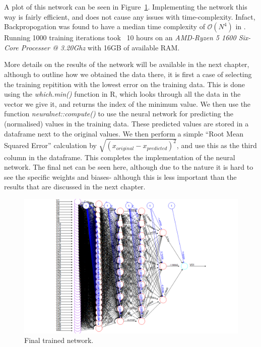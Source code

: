 A plot of this network can be seen in Figure~\ref{bestnet}. Implementing the network this way is fairly efficient, and does not cause any issues with time-complexity. Infact, Backpropogation 
was found to have a median time complexity of $\mathcal{O}(N^4)$ in \cite{lister}. Running 1000 training iterations took ~10 hours on an \textit{AMD-Ryzen 5 1600 Six-Core Processer @ 3.20Ghz} with 16GB of available RAM.

More details on the results of the network will be available in the next chapter, although to outline how we obtained the data there, it is first a case of selecting the training repitition 
with the lowest error on the training data. This is done using the \textit{which.min()} function in R, which looks through all the data in the vector we give it, and returns the index of the minimum value.
We then use the function \textit{neuralnet::compute()} to use the neural network for predicting the (normalised) values in the training data. These predicted values are stored in a dataframe next to the original values. 
We then perform a simple ``Root Mean Squared Error'' calculation by $\sqrt{(x_{original}-x_{predicted})^2}$, and use this as the third column in the dataframe. This completes the implementation of the neural network.
The final net can be seen here, although due to the nature it is hard to see the specific weights and biases- although this is less important than the results that are discussed in the next chapter. 

\begin{figure}[h] 
    \centering
    \includegraphics[width=0.9\linewidth]{figures/bestnet.png}
    \caption{Final trained network. }
    \label{bestnet}
\end{figure}